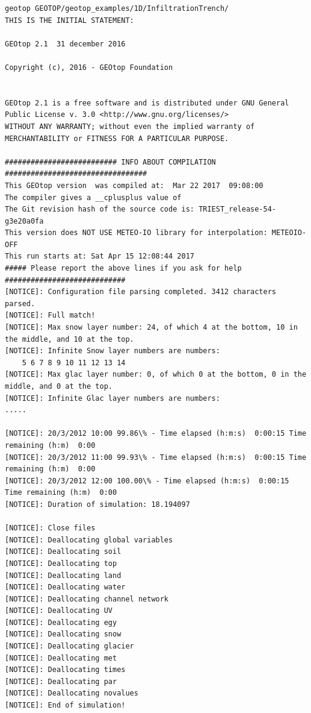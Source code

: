 \footnotesize{
\begin{verbatim}
geotop GEOTOP/geotop_examples/1D/InfiltrationTrench/
THIS IS THE INITIAL STATEMENT:

GEOtop 2.1  31 december 2016

Copyright (c), 2016 - GEOtop Foundation


GEOtop 2.1 is a free software and is distributed under GNU General Public License v. 3.0 <http://www.gnu.org/licenses/>
WITHOUT ANY WARRANTY; without even the implied warranty of MERCHANTABILITY or FITNESS FOR A PARTICULAR PURPOSE.

########################## INFO ABOUT COMPILATION #################################
This GEOtop version  was compiled at:  Mar 22 2017  09:08:00
The compiler gives a __cplusplus value of
The Git revision hash of the source code is: TRIEST_release-54-g3e20a0fa
This version does NOT USE METEO-IO library for interpolation: METEOIO-OFF
This run starts at: Sat Apr 15 12:08:44 2017
##### Please report the above lines if you ask for help ############################
[NOTICE]: Configuration file parsing completed. 3412 characters parsed.
[NOTICE]: Full match!
[NOTICE]: Max snow layer number: 24, of which 4 at the bottom, 10 in the middle, and 10 at the top.
[NOTICE]: Infinite Snow layer numbers are numbers:
	5 6 7 8 9 10 11 12 13 14
[NOTICE]: Max glac layer number: 0, of which 0 at the bottom, 0 in the middle, and 0 at the top.
[NOTICE]: Infinite Glac layer numbers are numbers:
.....

[NOTICE]: 20/3/2012 10:00 99.86\% - Time elapsed (h:m:s)  0:00:15 Time remaining (h:m)  0:00
[NOTICE]: 20/3/2012 11:00 99.93\% - Time elapsed (h:m:s)  0:00:15 Time remaining (h:m)  0:00
[NOTICE]: 20/3/2012 12:00 100.00\% - Time elapsed (h:m:s)  0:00:15 Time remaining (h:m)  0:00
[NOTICE]: Duration of simulation: 18.194097

[NOTICE]: Close files
[NOTICE]: Deallocating global variables
[NOTICE]: Deallocating soil
[NOTICE]: Deallocating top
[NOTICE]: Deallocating land
[NOTICE]: Deallocating water
[NOTICE]: Deallocating channel network
[NOTICE]: Deallocating UV
[NOTICE]: Deallocating egy
[NOTICE]: Deallocating snow
[NOTICE]: Deallocating glacier
[NOTICE]: Deallocating met
[NOTICE]: Deallocating times
[NOTICE]: Deallocating par
[NOTICE]: Deallocating novalues
[NOTICE]: End of simulation!



\end{verbatim}
}





